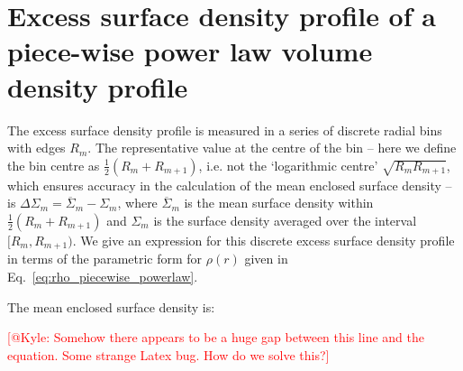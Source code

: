 \documentclass[usenatbib]{mnras}
\begin{document}

\appendix
\onecolumn
\section{Excess surface density profile of a piece-wise power law volume density profile}
\label{sec:appendix_invert_esd}

\noindent The excess surface density profile is measured in a series of discrete radial bins with edges $R_m$. The representative value at the centre of the bin -- here we define the bin centre as $\frac{1}{2}(R_m+R_{m+1})$, i.e. not the `logarithmic centre' $\sqrt{R_mR_{m+1}}$, which ensures accuracy in the calculation of the mean enclosed surface density -- is $\Delta\Sigma_m=\overline{\Sigma}_m-\Sigma_m$, where $\overline{\Sigma}_m$ is the mean surface density within $\frac{1}{2}(R_m+R_{m+1})$ and $\Sigma_m$ is the surface density averaged over the interval $[R_m,R_{m+1})$. We give an expression for this discrete excess surface density profile in terms of the parametric form for $\rho(r)$ given in Eq.~\ref{eq:rho_piecewise_powerlaw}.

The mean enclosed surface density is:

\textcolor{red}{[@Kyle: Somehow there appears to be a huge gap between this line and the equation. Some strange Latex bug. How do we solve this?]}
\end{document}
